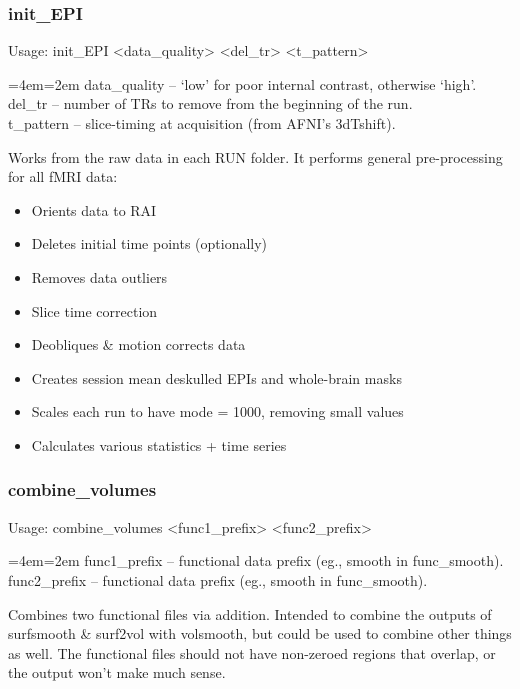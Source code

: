 \documentclass[final,titlepage,letterpaper,oneside,12pt]{article}
\renewcommand{\texttt}[2][BrickRed]{\textcolor{#1}{\ttfamily #2}}%
\newenvironment{blockquote}{%
  \par%
  \medskip
  \leftskip=4em\rightskip=2em%
  \noindent\ignorespaces}{%
  \par\medskip}
\begin{document}
\subsubsection{init\_EPI}
Usage: \texttt{init\_EPI <data\_quality> <del\_tr> <t\_pattern>}

\begin{blockquote}
data\_quality -- `low' for poor internal contrast, otherwise `high'. \\
del\_tr -- number of TRs to remove from the beginning of the run. \\
t\_pattern -- slice-timing at acquisition (from AFNI's 3dTshift). \
\end{blockquote}

\noindent Works from the raw data in each RUN folder. It performs general pre-processing for all fMRI data:

\begin{itemize} \itemsep-2pt
    \item{Orients data to RAI}
    \item{Deletes initial time points (optionally)}
    \item{Removes data outliers}
    \item{Slice time correction}
    \item{Deobliques \& motion corrects data}
    \item{Creates session mean deskulled EPIs and whole-brain masks}
    \item{Scales each run to have mode = 1000, removing small values}
    \item{Calculates various statistics + time series}
\end{itemize}

\subsubsection{combine\_volumes}
Usage: \texttt{combine\_volumes <func1\_prefix> <func2\_prefix>}

\begin{blockquote}
func1\_prefix -- functional data prefix (eg., smooth in func\_smooth).
func2\_prefix -- functional data prefix (eg., smooth in func\_smooth).
\end{blockquote}

\noindent Combines two functional files via addition. Intended to combine the outputs of \texttt{surfsmooth} \& \texttt{surf2vol} with \texttt{volsmooth}, but could be used to combine other things as well. The functional files should not have non-zeroed regions that overlap, or the output won't make much sense.
\end{document}
